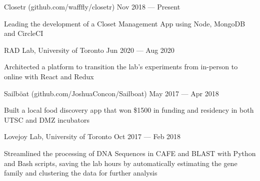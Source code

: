 \begin{cventries}
  \cventry
    {}
    {Closetr (github.com/wafffly/closetr)}
    {}
    {Nov 2018 --- Present}
    {}
    {
      \begin{cvitems}
        \item {Leading the development of a Closet Management App using Node, MongoDB and CircleCI}
      \end{cvitems}
    }
  \cventry
    {}
    {RAD Lab, University of Toronto}
    {}
    {Jun 2020 --- Aug 2020}
    {}
    {
      \begin{cvitems}
        \item {Architected a platform to transition the lab's experiments from in-person to online with React and Redux}
      \end{cvitems}
    }
  \cventry
    {}
    {Sailböat (github.com/JoshuaConcon/Sailboat)}
    {}
    {May 2017 --- Apr 2018}
    {}
    {
      \begin{cvitems}
        \item {Built a local food discovery app that won \$1500 in funding and residency in both UTSC and DMZ incubators}
      \end{cvitems}
    }
  \cventry
    {}
    {Lovejoy Lab, University of Toronto}
    {}
    {Oct 2017 --- Feb 2018}
    {}
    {
      \begin{cvitems}
        \item {Streamlined the processing of DNA Sequences in CAFE and BLAST with Python and Bash scripts, saving the lab hours by automatically estimating the gene family and clustering the data for further analysis}
      \end{cvitems}
    }
\end{cventries}